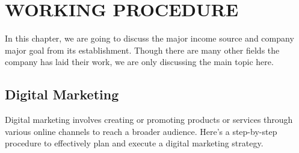 \chapter{WORKING PROCEDURE}
In this chapter, we are going to discuss the major income source and company major goal from its establishment. Though there are many other fields the company has laid their work, we are only discussing the main topic here.
\section{Digital Marketing}
Digital marketing involves creating or promoting products or services through various online channels to reach a broader audience. Here's a step-by-step procedure to effectively plan and execute a digital marketing strategy.

